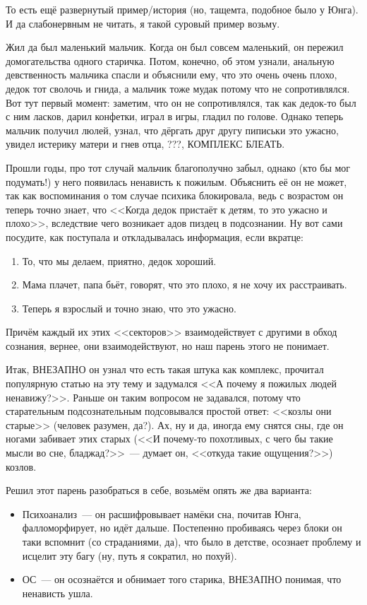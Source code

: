 \documentclass[a5paper,12pt,twoside]{memoir}
\begin{document}
То есть ещё развернутый пример/история (но, тащемта, подобное было у Юнга). И да слабонервным не читать, я такой суровый пример возьму. 

Жил да был маленький мальчик. Когда он был совсем маленький, он пережил домогательства одного старичка. Потом, конечно, об этом узнали, анальную девственность мальчика спасли и объяснили ему, что это очень очень плохо, дедок тот сволочь и гнида, а мальчик тоже мудак потому что не сопротивлялся. Вот тут первый момент: заметим, что он не сопротивлялся, так как дедок-то был с ним ласков, дарил конфетки, играл в игры, гладил по голове. Однако теперь мальчик получил люлей, узнал, что дёргать друг другу пиписьки это ужасно, увидел истерику матери и гнев отца, ???, КОМПЛЕКС БЛЕАТЬ.
 
Прошли годы, про тот случай мальчик благополучно забыл, однако (кто бы мог подумать!) у него появилась ненависть к пожилым. Объяснить её он не может, так как воспоминания о том случае психика блокировала, ведь с возрастом он теперь точно знает, что <<Когда дедок пристаёт к детям, то это ужасно и плохо>>, вследствие чего возникает адов пиздец в подсознании. Ну вот сами посудите, как поступала и откладывалась информация, если вкратце:
\begin{enumerate}
\item То, что мы делаем, приятно, дедок хороший.
\item Мама плачет, папа бьёт, говорят, что это плохо, я не хочу их расстраивать.
\item Теперь я взрослый и точно знаю, что это ужасно. 
\end{enumerate}

Причём каждый их этих <<секторов>> взаимодействует с другими в обход сознания, вернее, они взаимодействуют, но наш парень этого не понимает.
 
Итак, ВНЕЗАПНО он узнал что есть такая штука как комплекс, прочитал популярную статью на эту тему и задумался <<А почему я пожилых людей ненавижу?>>. Раньше он таким вопросом не задавался, потому что старательным подсознательным подсовывался простой ответ: <<козлы они старые>> (человек разумен, да?). Ах, ну и да, иногда ему снятся сны, где он ногами забивает этих старых (<<И почему-то похотливых, с чего бы такие мысли во сне, бладжад?>>~--- думает он, <<откуда такие ощущения?>>) козлов. 

Решил этот парень разобраться в себе, возьмём опять же два варианта:
\begin{itemize} 
\item Психоанализ~--- он расшифровывает намёки сна, почитав Юнга, фалломорфирует, но идёт дальше. Постепенно пробиваясь через блоки он таки вспомнит (со страданиями, да), что было в детстве, осознает проблему и исцелит эту багу (ну, путь я сократил, но похуй).
\item ОС~--- он осознаётся и обнимает того старика, ВНЕЗАПНО понимая, что ненависть ушла.
\end{itemize}
\end{document}
